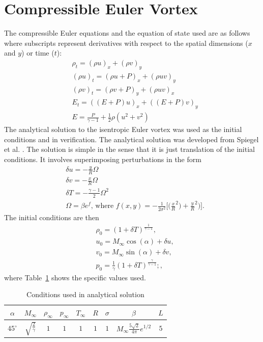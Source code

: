 \documentclass[preprints,article,accept,moreauthors,pdftex]{Definitions/mdpi}
\begin{document}
\section{Compressible Euler Vortex}
\label{Compressible-Euler}
The compressible Euler equations and the equation of state used are as follows where subscripts represent derivatives with respect to the spatial dimensions ($x$ and $y$) or time ($t$):
\begin{align*}
    &\rho_t  = (\rho u)_x + (\rho v)_y \\ 
    &(\rho u)_t  = (\rho u+P)_x + (\rho u v)_y\\
    &(\rho v)_t  = (\rho v+P)_y + (\rho u v)_x\\
    &E_t = ((E+P)u)_x+((E+P)v)_y\\
    &E = \frac{P}{\gamma -1}+\frac{1}{2}\rho(u^2+v^2)
\end{align*}
The analytical solution to the isentropic Euler vortex was used as the initial conditions and in verification. The analytical solution was developed from Spiegel et al. \cite{SpiegelAMethods}. The solution is simple in the sense that it is just translation of the initial conditions. It involves superimposing perturbations in the form
\begin{align*}
    &\delta u = -\frac{y}{R}\Omega\\
    &\delta v = -\frac{x}{R}\Omega\\
    &\delta T = -\frac{\gamma-1}{2} \Omega^2\\
    &\Omega = \beta e^{f}\text{, where } f(x,y) = -\frac{1}{2\sigma^2}\Bigg[\bigg(\frac{x}{R}^2\bigg)+\frac{y}{R}^2\bigg)\Bigg].
\end{align*}
The initial conditions are then 
\begin{align*}
    &\rho_0 = (1+\delta T)^{\frac{1}{\gamma-1}},\\
    &u_0 = M_\infty \cos(\alpha)+\delta u,\\
    &v_0 = M_\infty \sin(\alpha)+\delta v,\\
    &p_0 = \frac{1}{\gamma}(1+\delta T)^\frac{\gamma}{\gamma-1} ;,
\end{align*}
where Table~\ref{tab:eulerVortex} shows the specific values used.

\begin{table}[htb]
    \centering
    \begin{tabular}{@{}ccccccccc@{}}
    \toprule
    $\alpha$ & $M_\infty$  & $\rho_\infty$ & $p_\infty$ & $T_\infty$ & $R$ & $\sigma$ & $\beta$ & $L$ \\ 
    \midrule
    $45^\circ$ &  $\sqrt{\frac{2}{\gamma}}$ & $1$ & $1$ & $1$ & $1$ & $1$ & $M_\infty \frac{5\sqrt{2}}{4\pi}e^{1/2}$ & $5$\\
    \bottomrule
    \end{tabular}
    \caption{Conditions used in analytical solution \cite{shu1998essentially}}
    \label{tab:eulerVortex}
\end{table}
\end{document}
